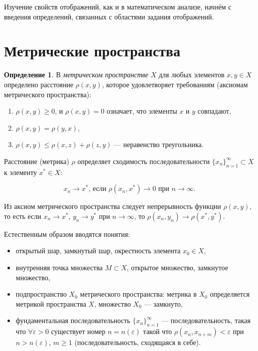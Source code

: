 \documentclass[12pt,a4paper,titlepage,oneside]{book}
\theoremstyle{definition}
\newtheorem*{definition}{Определение}
\theoremstyle{plain}
\theoremstyle{break}
\theoremstyle{remark}
\theoremstyle{remark}
\theoremstyle{remark}
\theoremstyle{remark}
\theoremstyle{plain}
\theoremstyle{plain}
\begin{document}
Изучение свойств отображений, как и в математическом анализе, начнём с введения определений, связанных с областями задания отображений.

\section{Метрические пространства}

\begin{definition}
В \textit{метрическом пространстве} $X$ для любых элементов $x, y \in X$ определено расстояние $\rho(x, y)$, которое удовлетворяет требованиям (аксиомам метрического пространства):
\begin{enumerate}

	\item $\rho(x, y)\geqslant 0$, и $\rho(x, y)=0$ означает, что элементы $x$ и $y$ совпадают,

	\item $\rho(x, y)=\rho(y, x)$,

	\item $ \rho(x, y)\leqslant \rho(x, z) +\rho(z, y)$ --- неравенство треугольника.
	
\end{enumerate}
\end{definition}

Расстояние (метрика) $\rho$ определяет сходимость последовательности $\lbrace x_n \rbrace_{n=1}^{\infty} \subset X$ к элементу $x^{*} \in X$:

\begin{equation*}
x_n \to x^* \mbox{, если }\rho(x_n, x^{*})\to 0 \mbox{ при } n\to\infty.
\end{equation*}

Из аксиом метрического пространства следует непрерывность функции $\rho(x, y)$, то есть если $x_n\to x^{*}$, $y_n\to y^{*}$ при $n \to \infty$, то $\rho(x_n, y_n) \to \rho(x^*, y^*)$.

Естественным образом вводятся понятия:

\begin{itemize}

	\item  открытый шар, замкнутый шар, окрестность элемента $x_0\in X$,

	\item внутренняя точка множества $M \subset X$, открытое множество, замкнутое множество,

	\item подпространство $X_0$ метрического пространства: метрика в $X_0$ определяется метрикой пространства $X$, множество $X_0$ --- замкнуто,

	\item фундаментальная последовательность $\lbrace x_n \rbrace_{n=1}^{\infty}$ --- последовательность, такая что $\forall \varepsilon > 0$ существует номер $n = n(\varepsilon)$ такой что $\rho(x_n, x_{n+m}) < \varepsilon$ при $n > n(\varepsilon)$, $m \geqslant 1$ (последовательность, сходящаяся в себе).

\end{itemize}
\end{document}
